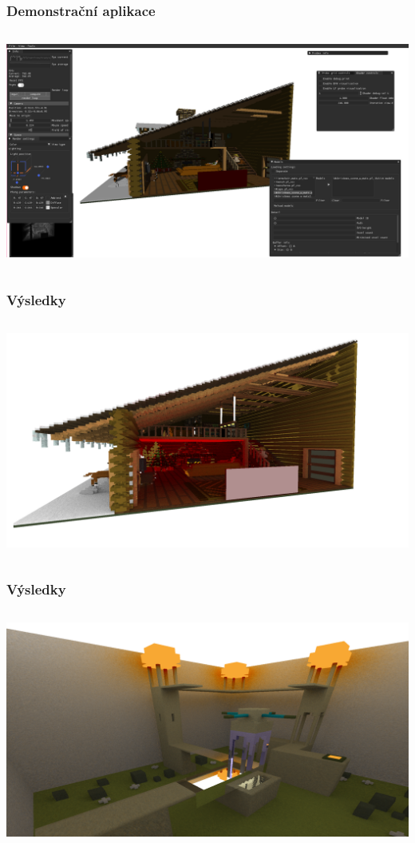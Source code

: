 \documentclass[10pt,xcolor=pdflatex,hyperref={unicode}]{beamer}
\begin{document}
\begin{frame}\frametitle{Demonstrační aplikace}
    \begin{column}{\textwidth}
        \includegraphics[width=\textwidth]{img/app.png}
    \end{column}
\end{frame}

\appendix


\begin{frame}\frametitle{Výsledky}
    \begin{column}{\textwidth}
        \includegraphics[width=\textwidth]{img/render1.png}
    \end{column}
\end{frame}

\begin{frame}\frametitle{Výsledky}
    \begin{column}{\textwidth}
        \includegraphics[width=\textwidth]{img/indirect_render_2.png}
    \end{column}
\end{frame}
\end{document}
